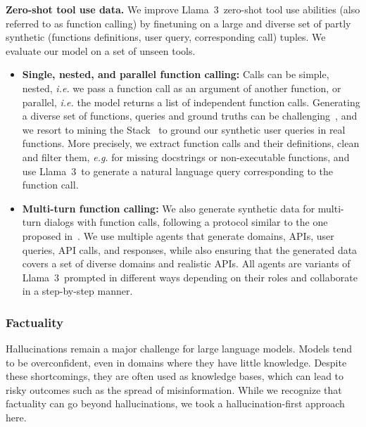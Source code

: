 \textbf{Zero-shot tool use data.} We improve Llama~3~zero-shot tool use abilities (also referred to as function calling) by finetuning on a large and diverse set of partly synthetic (functions definitions, user query, corresponding call) tuples. We evaluate our model on a set of unseen tools.

\begin{itemize}
    \item \textbf{Single, nested, and parallel function calling:} Calls can be simple, nested, \textit{i.e.} we pass a function call as an argument of another function, or parallel, \textit{i.e.} the model returns a list of independent function calls. Generating a diverse set of functions, queries and ground truths can be challenging~\citep{mekala2024toolverifier}, and we resort to mining the Stack~\citep{kocetkov2022stack3tbpermissively} to ground our synthetic user queries in real functions. More precisely, we extract function calls and their definitions, clean and filter them, \textit{e.g.} for missing docstrings or non-executable functions, and use Llama~3~to generate a natural language query corresponding to the function call. 

    \item \textbf{Multi-turn function calling:}  We also generate synthetic data for multi-turn dialogs with function calls, following a protocol similar to the one proposed in~\cite{li2023api}. We use multiple agents that generate domains, APIs, user queries, API calls, and responses, while also ensuring that the generated data covers a set of diverse domains and realistic APIs. All agents are variants of Llama~3~prompted in different ways depending on their roles and collaborate in a step-by-step manner. 

\end{itemize}

\subsubsection{Factuality}\label{subsubsec:factuality}

Hallucinations remain a major challenge for large language models. Models tend to be overconfident, even in domains where they have little knowledge. Despite these shortcomings, they are often used as knowledge bases, which can lead to risky outcomes such as the spread of misinformation. While we recognize that factuality can go beyond hallucinations, we took a hallucination-first approach here.

